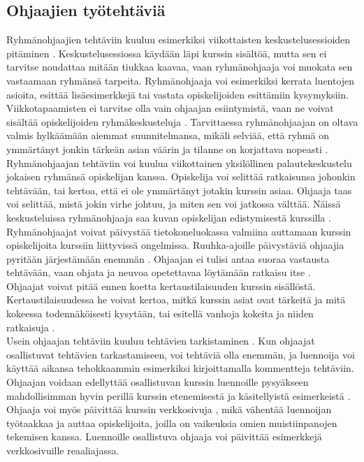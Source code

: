 \documentclass[finnish]{tktltiki2}
\theoremstyle{definition}
\theoremstyle{remark}
\begin{document}
\subsection{Ohjaajien työtehtäviä}
Ryhmänohjaajien tehtäviin kuuluu esimerkiksi viikottaisten keskustelusessioiden pitäminen \cite{Reges88}. Keskustelusessiossa käydään läpi kurssin sisältöä, mutta sen ei tarvitse noudattaa mitään tiukkaa kaavaa, vaan ryhmänohjaaja voi muokata sen vastaamaan ryhmänsä tarpeita. Ryhmänohjaaja voi esimerkiksi kerrata luentojen asioita, esittää lisäesimerkkejä tai vastata opiskelijoiden esittämiin kysymyksiin. Viikkotapaamisten ei tarvitse olla vain ohjaajan esiintymistä, vaan ne voivat sisältää opiskelijoiden ryhmäkeskusteluja \cite{Decker06}. Tarvittaessa ryhmänohjaajan on oltava valmis hylkäämään aiemmat suunnitelmansa, mikäli selviää, että ryhmä on ymmärtänyt jonkin tärkeän asian väärin ja tilanne on korjattava nopeasti \cite{Reges88}.
\\
Ryhmänohjaajan tehtäviin voi kuulua viikottainen yksilöllinen palautekeskustelu jokaisen ryhmänsä opiskelijan kanssa. Opiskelija voi selittää ratkaisunsa johonkin tehtävään, tai kertoa, että ei ole ymmärtänyt jotakin kurssin asiaa. Ohjaaja taas voi selittää, mistä jokin virhe johtuu, ja miten sen voi jatkossa välttää. Näissä keskusteluissa ryhmänohjaaja saa kuvan opiskelijan edistymisestä kurssilla \cite{Reges88,Reges03}.
\\
Ryhmänohjaajat voivat päivystää tietokoneluokassa valmiina auttamaan kurssin opiskelijoita kurssiin liittyvissä ongelmissa. Ruuhka-ajoille päivystäviä ohjaajia pyritään järjestämään enemmän \cite{Reges88, Reges03}. Ohjaajan ei tulisi antaa suoraa vastausta tehtävään, vaan ohjata ja neuvoa opetettavaa löytämään ratkaisu itse \cite{Vikberg}.
\\
Ohjaajat voivat pitää ennen koetta kertaustilaisuuden kurssin sisällöstä. Kertaustilaisuudessa he voivat kertoa, mitkä kurssin asiat ovat tärkeitä ja mitä kokeessa todennäköisesti kysytään, tai esitellä vanhoja kokeita ja niiden ratkaisuja \cite{Decker06}.
\\
Usein ohjaajan tehtäviin kuuluu tehtävien tarkistaminen \cite{Dickson11}. Kun ohjaajat osallistuvat tehtävien tarkastamiseen, voi tehtäviä olla enemmän, ja luennoija voi käyttää aikansa tehokkaammin esimerkiksi kirjoittamalla kommentteja tehtäviin.
\\
Ohjaajan voidaan edellyttää osallistuvan kurssin luennoille pysyäkseen mahdollisimman hyvin perillä kurssin etenemisestä ja käsitellyistä esimerkeistä \cite{Reges03, Decker06}. Ohjaaja voi myös päivittää kurssin verkkosivuja \cite{Dickson11}, mikä vähentää luennoijan työtaakkaa ja auttaa opiskelijoita, joilla on vaikeuksia omien muistiinpanojen tekemisen kanssa. Luennoille osallistuva ohjaaja voi päivittää esimerkkejä verkkosivuille reaaliajassa.
\end{document}
